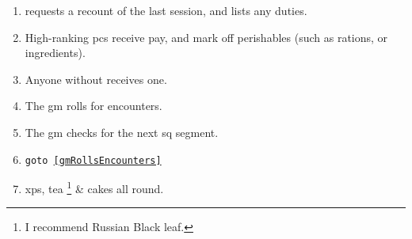 
\begin{enumerate}
  \item
   requests a recount of the last session, and lists any duties.
  \item
  High-ranking \Glspl{pc} receive pay, and mark off perishables (such as rations, or \glspl{ingredient}).
  \item
  Anyone without  receives one.
  \label{newPC}
  \item
  The \gls{gm} rolls for encounters.
  \label{gmRollsEncounters}
  \item
  The \gls{gm} checks for the next \gls{sq} \gls{segment}.
  \item
  {\tt goto \ref{gmRollsEncounters}}
  \item
  \Glspl{xp}, tea%
  \footnote{I recommend Russian Black leaf.}
  \& cakes all round.
\end{enumerate}
